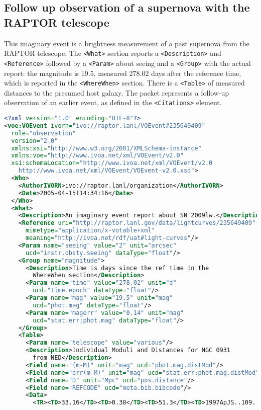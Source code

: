 \documentclass[11pt,a4paper]{ivoa}
\begin{document}
\subsection{Follow up observation of a supernova with the RAPTOR telescope}
This imaginary event is a brightness measurement of a past supernova from the
RAPTOR \citep{bib10} telescope. The \verb|<What>| section reports a
\verb|<Description>| and \verb|<Reference>| followed by a \verb|<Param>| about seeing
and a \verb|<Group>| with the actual report: the magnitude is 19.5, measured
278.02 days after the reference time, which is reported in the
\verb|<WhereWhen>| section. There is a \verb|<Table>| of measured distances to the
presumed host galaxy. The packet represents a follow-up observation of an
earlier event, as defined in the \verb|<Citations>| element.
\begin{lstlisting}[language=XML]
<?xml version="1.0" encoding="UTF-8"?>
<voe:VOEvent ivorn="ivo://raptor.lanl/VOEvent#235649409"
  role="observation"
  version="2.0"
  xmlns:xsi="http://www.w3.org/2001/XMLSchema-instance"
  xmlns:voe="http://www.ivoa.net/xml/VOEvent/v2.0"
  xsi:schemaLocation="http://www.ivoa.net/xml/VOEvent/v2.0
    http://www.ivoa.net/xml/VOEvent/VOEvent-v2.0.xsd">
  <Who>
    <AuthorIVORN>ivo://raptor.lanl/organization</AuthorIVORN>
    <Date>2005-04-15T14:34:16</Date>
  </Who>
  <What>
    <Description>An imaginary event report about SN 2009lw.</Description>
    <Reference uri="http://raptor.lanl.gov/data/lightcurves/235649409"
      mimetype="application/x-votable+xml"
      meaning="http://ivoa.net/rdf/uat#light-curves"/>
    <Param name="seeing" value="2" unit="arcsec"
      ucd="instr.obsty.seeing" dataType="float"/>
    <Group name="magnitude">
      <Description>Time is days since the ref time in the
        WhereWhen section</Description>
      <Param name="time" value="278.02" unit="d"
        ucd="time.epoch" dataType="float"/>
      <Param name="mag" value="19.5" unit="mag"
        ucd="phot.mag" dataType="float"/>
      <Param name="magerr" value="0.14" unit="mag"
        ucd="stat.err;phot.mag" dataType="float"/>
    </Group>
    <Table>
      <Param name="telescope" value="various"/>
      <Description>Individual Moduli and Distances for NGC 0931
        from NED</Description>
      <Field name="(m-M)" unit="mag" ucd="phot.mag.distMod"/>
      <Field name="err(m-M)" unit="mag" ucd="stat.err;phot.mag.distMod"/>
      <Field name="D" unit="Mpc" ucd="pos.distance"/>
      <Field name="REFCODE" ucd="meta.bib.bibcode"/>
      <Data>
        <TR><TD>33.16</TD><TD>0.38</TD><TD>51.3</TD><TD>1997ApJS..109..333W</TD></TR>

\end{lstlisting}
\end{document}
